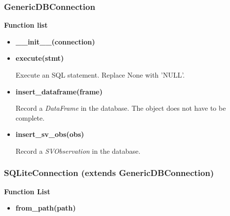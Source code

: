 
\subsubsection{GenericDBConnection}

\textbf{Function list}
\begin{itemize}
	\item \textbf{\_\_init\_\_(connection)}


	\item \textbf{execute(stmt)}

	Execute an SQL statement. Replace None with 'NULL'.

	\item \textbf{insert\_dataframe(frame)}

	Record a \emph{DataFrame} in the database. The object does not have to be complete.


	\item \textbf{insert\_sv\_obs(obs)}

	Record a \emph{SVObservation} in the database.


\end{itemize}

\subsubsection{SQLiteConnection (extends GenericDBConnection)}

\textbf{Function List}
\begin{itemize}
	\item \textbf{from\_path(path)} \classmethod


\end{itemize}
